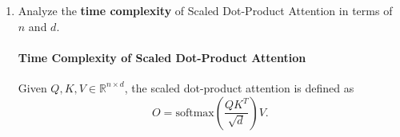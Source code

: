 \documentclass[12pt,a4paper]{article}
\theoremstyle{definition}
\begin{document}
\begin{enumerate}
\begin{enumerate}
\begin{algorithm}[H]
                $S \leftarrow QK^T$ 
                
                $S \leftarrow S / \sqrt{d}$\;
                
                $A \leftarrow \text{softmax}(S)$
                
                $O \leftarrow AV$\;
                
                \textbf{output} $O$\;
            \end{algorithm}
            \begin{algorithm}[H]
                \LinesNumbered
                \BlankLine
                \caption{Multi-Head Attention} \label{multihead}
                
                
                $H \leftarrow \text{Concat}(head_1, \dots, head_h)$ 
                
                $O \leftarrow HW^O$\;
                
                \textbf{output} $O$\;
            \end{algorithm}

        \item Analyze the \textbf{time complexity} of Scaled Dot-Product Attention in terms of $n$ and $d$. 
        
        {\color{blue}{(Detailed explanation required)}}

        {\color{red}{(HINT: $d_k = d_v = d$)}}
        \paragraph{Time Complexity of Scaled Dot-Product Attention}

            Given $Q, K, V \in \mathbb{R}^{n \times d}$, the scaled dot-product attention is defined as
            \[
            O = \text{softmax}\left(\frac{QK^T}{\sqrt{d}}\right)V.
            \]
            

\end{enumerate}
\end{enumerate}
\end{document}
